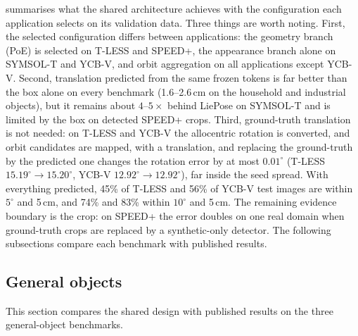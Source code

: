  summarises what the shared architecture achieves with the configuration each application selects on its validation data. Three things are worth noting. First, the selected configuration differs between applications: the geometry branch (PoE) is selected on T-LESS and SPEED+, the appearance branch alone on SYMSOL-T and YCB-V, and orbit aggregation on all applications except YCB-V. Second, translation predicted from the same frozen tokens is far better than the box alone on every benchmark (1.6--2.6\,cm on the household and industrial objects), but it remains about $4\text{--}5\times$ behind LiePose on SYMSOL-T and is limited by the box on detected SPEED+ crops. Third, ground-truth translation is not needed: on T-LESS and YCB-V the allocentric rotation is converted, and orbit candidates are mapped, with a translation, and replacing the ground-truth by the predicted one changes the rotation error by at most $0.01^\circ$ (T-LESS $15.19^\circ\to15.20^\circ$, YCB-V $12.92^\circ\to12.92^\circ$), far inside the seed spread. With everything predicted, 45\% of T-LESS and 56\% of YCB-V test images are within $5^\circ$ and 5\,cm, and 74\% and 83\% within $10^\circ$ and 5\,cm. The remaining evidence boundary is the crop: on SPEED+ the error doubles on one real domain when ground-truth crops are replaced by a synthetic-only detector. The following subsections compare each benchmark with published results.

\subsection{General objects}
\label{sec:general}\label{sec:sota}
This section compares the shared design with published results on the three general-object benchmarks.

\begin{table}[t]
  \centering\footnotesize
  \setlength{\tabcolsep}{4pt}
  
  \caption{\textbf{T-LESS}, real BOP19 test targets of our 7 objects. Symmetry-aware rotation recall (\%) at 2/5/10$^\circ$ and mean error, PoE variant, 3 seeds. LiePose numbers are its per-object results (Tab.~8 of~\cite{hsiao2024liepose}) averaged over the same 7 objects; it fine-tunes its backbone jointly on all 30 objects and multiplies the crop by the ground-truth visible mask. Ours: frozen backbones, ground-truth box, no mask; continuous symmetries (objects 1 and 4) are discretised in $10^\circ$ steps for the error, which can add up to $5^\circ$ for those objects. A0/A1/A2: single, canonical and multi-path targets (\cref{sec:symtarget}).}
  \label{tab:tless_sota}
\end{table}

